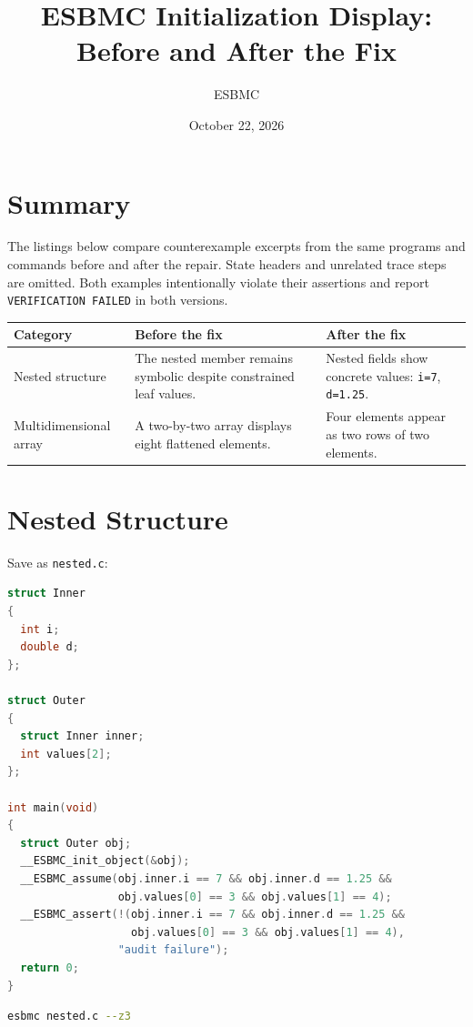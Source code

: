 \documentclass[11pt]{article}
\title{ESBMC Initialization Display: Before and After the Fix}
\author{ESBMC}
\date{October 22, 2026}
\begin{document}
\maketitle

\section{Summary}

The listings below compare counterexample excerpts from the same programs and
commands before and after the repair. State headers and unrelated trace steps
are omitted. Both examples intentionally violate their assertions and report
\texttt{VERIFICATION FAILED} in both versions.

\begin{tabularx}{\textwidth}{|l|X|X|}
\hline
\textbf{Category} & \textbf{Before the fix} & \textbf{After the fix} \\
\hline
Nested structure & The nested member remains symbolic despite constrained leaf values. & Nested fields show concrete values: \texttt{i=7}, \texttt{d=1.25}. \\
\hline
Multidimensional array & A two-by-two array displays eight flattened elements. & Four elements appear as two rows of two elements. \\
\hline
\end{tabularx}

\section{Nested Structure}

Save as \texttt{nested.c}:

\begin{lstlisting}[language=C]
struct Inner
{
  int i;
  double d;
};

struct Outer
{
  struct Inner inner;
  int values[2];
};

int main(void)
{
  struct Outer obj;
  __ESBMC_init_object(&obj);
  __ESBMC_assume(obj.inner.i == 7 && obj.inner.d == 1.25 &&
                 obj.values[0] == 3 && obj.values[1] == 4);
  __ESBMC_assert(!(obj.inner.i == 7 && obj.inner.d == 1.25 &&
                   obj.values[0] == 3 && obj.values[1] == 4),
                 "audit failure");
  return 0;
}
\end{lstlisting}

\begin{lstlisting}[language=bash]
esbmc nested.c --z3
\end{lstlisting}
\end{document}
